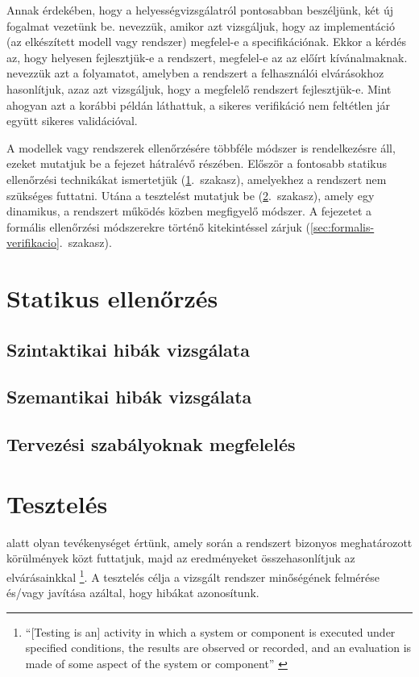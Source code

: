 Annak érdekében, hogy a helyességvizsgálatról pontosabban beszéljünk, két új fogalmat vezetünk be.  nevezzük, amikor azt vizsgáljuk, hogy az implementáció (az elkészített modell vagy rendszer) megfelel-e a specifikációnak. Ekkor a kérdés az, hogy helyesen fejlesztjük-e a rendszert, megfelel-e az az előírt kívánalmaknak.  nevezzük azt a folyamatot, amelyben a rendszert a felhasználói elvárásokhoz hasonlítjuk, azaz azt vizsgáljuk, hogy a megfelelő rendszert fejlesztjük-e. Mint ahogyan azt a korábbi példán láthattuk, a sikeres verifikáció nem feltétlen jár együtt sikeres validációval.

A modellek vagy rendszerek ellenőrzésére többféle módszer is rendelkezésre áll, ezeket mutatjuk be a fejezet hátralévő részében. Először a fontosabb statikus ellenőrzési technikákat ismertetjük (\ref{sec:statikus-ellenorzes}.~szakasz), amelyekhez a rendszert nem szükséges futtatni. Utána a tesztelést mutatjuk be (\ref{sec:teszteles}.~szakasz), amely egy dinamikus, a rendszert működés közben megfigyelő módszer. A fejezetet a formális ellenőrzési módszerekre történő kitekintéssel zárjuk (\ref{sec:formalis-verifikacio}.~szakasz).



\section{Statikus ellenőrzés}\label{sec:statikus-ellenorzes}

\subsection{Szintaktikai hibák vizsgálata}
\subsection{Szemantikai hibák vizsgálata}
\subsection{Tervezési szabályoknak megfelelés}

\section{Tesztelés}\label{sec:teszteles}

 alatt olyan tevékenységet értünk, amely során a rendszert bizonyos meghatározott körülmények közt futtatjuk, majd az eredményeket összehasonlítjuk az elvárásainkkal
\footnote{``[Testing is an] activity in which a system or component is executed under specified conditions, the results are observed or recorded, and an evaluation is made of some aspect of the system or component'' \cite{IEEE-24765}}\cite{IEEE-24765}. A tesztelés célja a vizsgált rendszer minőségének felmérése és/vagy javítása azáltal, hogy hibákat azonosítunk. 

